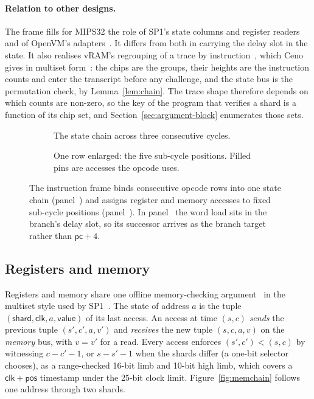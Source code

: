 \paragraph{Relation to other designs.} The frame fills for MIPS32 the role of SP1's state columns and register readers~\citep{sp1} and of OpenVM's adapters~\citep{openvm}. It differs from both in carrying the delay slot in the state. It also realises vRAM's regrouping of a trace by instruction~\citep{vram}, which Ceno gives in multiset form~\citep[\S6.2]{ceno}: the chips are the groups, their heights are the instruction counts and enter the transcript before any challenge, and the state bus is the permutation check, by Lemma~\ref{lem:chain}. The trace shape therefore depends on which counts are non-zero, so the key of the program that verifies a shard is a function of its chip set, and Section~\ref{sec:argument-block} enumerates those sets.

\begin{figure}[!tbp]
\centering
\begin{subfigure}{\textwidth}
\centering
\resizebox{\textwidth}{!}{}
\caption{The state chain across three consecutive cycles.}
\label{fig:frame-flow}
\end{subfigure}

\vspace{0.7em}
\begin{subfigure}{0.76\textwidth}
\centering
\resizebox{\textwidth}{!}{}
\caption{One row enlarged: the five sub-cycle positions. Filled pins are accesses the opcode uses.}
\label{fig:frame-chip}
\end{subfigure}
\caption{The instruction frame binds consecutive opcode rows into one state chain (panel~) and assigns register and memory accesses to fixed sub-cycle positions (panel~). In panel~ the word load sits in the branch's delay slot, so its successor arrives as the branch target rather than $\mathsf{pc}{+}4$.}
\label{fig:frame}
\end{figure}

\subsection{Registers and memory}
\label{sec:air-memory}

Registers and memory share one offline memory-checking argument~\citep{blum1994} in the multiset style used by SP1~\citep{sp1}. The state of address $a$ is the tuple $(\mathsf{shard}, \mathsf{clk}, a, \mathsf{value})$ of its last access. An access at time $(s, c)$ \emph{sends} the previous tuple $(s', c', a, v')$ and \emph{receives} the new tuple $(s, c, a, v)$ on the \emph{memory} bus, with $v = v'$ for a read. Every access enforces $(s', c') < (s, c)$ by witnessing $c - c' - 1$, or $s - s' - 1$ when the shards differ (a one-bit selector chooses), as a range-checked 16-bit limb and 10-bit high limb, which covers a $\mathsf{clk} + \mathsf{pos}$ timestamp under the 25-bit clock limit. Figure~\ref{fig:memchain} follows one address through two shards.

